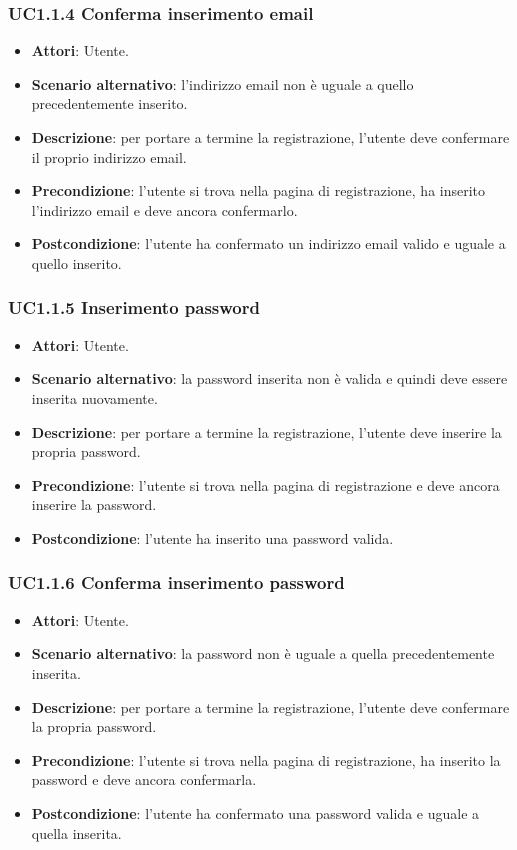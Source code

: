 \subsubsection{UC1.1.4 Conferma inserimento email}
\begin{itemize}
\item \textbf{Attori}: Utente.
\item \textbf{Scenario alternativo}: l'indirizzo email non è uguale a quello precedentemente inserito.
\item \textbf{Descrizione}: per portare a termine la registrazione, l'utente deve confermare il proprio indirizzo email.
\item \textbf{Precondizione}: l'utente si trova nella pagina di registrazione, ha inserito l'indirizzo email e deve ancora confermarlo.
\item \textbf{Postcondizione}: l'utente ha confermato un indirizzo email valido e uguale a quello inserito.
\end{itemize}
\subsubsection{UC1.1.5 Inserimento password}
\begin{itemize}
\item \textbf{Attori}: Utente.
\item \textbf{Scenario alternativo}: la password inserita non è valida e quindi deve essere inserita nuovamente.
\item \textbf{Descrizione}: per portare a termine la registrazione, l'utente deve inserire la propria password.
\item \textbf{Precondizione}: l'utente si trova nella pagina di registrazione e deve ancora inserire la password.
\item \textbf{Postcondizione}: l'utente ha inserito una password valida.
\end{itemize}
\subsubsection{UC1.1.6 Conferma inserimento password}
\begin{itemize}
\item \textbf{Attori}: Utente.
\item \textbf{Scenario alternativo}: la password non è uguale a quella precedentemente inserita.
\item \textbf{Descrizione}: per portare a termine la registrazione, l'utente deve confermare la propria password.
\item \textbf{Precondizione}: l'utente si trova nella pagina di registrazione, ha inserito la password e deve ancora confermarla.
\item \textbf{Postcondizione}: l'utente ha confermato una password valida e uguale a quella inserita.
\end{itemize}
